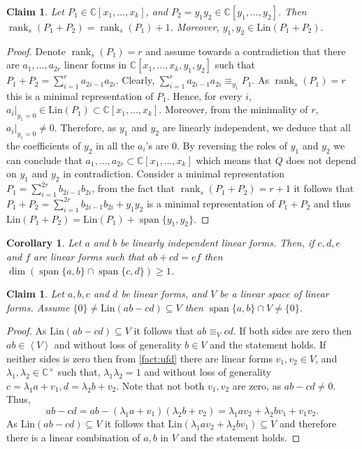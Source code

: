 \documentclass[10pt,a4paper]{article}
\newtheorem{claim}[theorem]{Claim}
\newtheorem{corollary}[theorem]{Corollary}
\def\rank{\operatorname{rank}}
\renewcommand{\C}{\mathbb{C}}
\newcommand{\ideal}[1]{\left \langle{#1}\right \rangle}
\newcommand{\MVar}[2]{{#1}_1,\ldots, {#1}_{#2}}
\newcommand{\PRing}[3]{\mathbb{#1}[ \MVar{#2}{#3}]}
\newcommand{\CRing}[2]{\PRing{C}{#1}{#2}}
\newcommand{\spn}[1]{\operatorname{span}\{{#1}\}}
\newcommand{\MS}{\text{Lin}}
\begin{document}
\begin{claim}\label{cla:ind-rank}
Let $P_1\in \CRing{x}{k}$, and $P_2 = y_1y_2\in \CRing{y}{2}$. Then $ \rank_s (P_1+P_2) = \rank_s(P_1) + 1$. Moreover, $y_1,y_2 \in \MS(P_1+P_2).$
\end{claim}

\begin{proof}
Denote $\rank_s(P_1) = r$ and assume towards a contradiction that there are $\MVar{a}{2r}$ linear forms in $\C[x_1,\dots,x_k,y_1,y_2]$ such that $P_1+P_2 = \sum\limits_{i=1}^{r}a_{2i-1}a_{2i}$. 
Clearly, $\sum\limits_{i=1}^{r}a_{2i-1}a_{2i} \equiv_{y_1} P_1$. As $\rank_s(P_1) = r$  this is a minimal representation of $P_1$. Hence, for every $i$, $a_i|_{y_1=0} \in\MS(P_1)\subset \CRing{x}{k}$. Moreover, from the minimality of $r$, $a_i|_{y_1=0} \neq 0$. Therefore, as $y_1$ and $y_2$ are linearly independent, we deduce that all the coefficients of $y_2$ in all the $a_i$'s are 0. By reversing the roles of $y_1$ and $y_2$ we can conclude that $\MVar{a}{2r}\subset \CRing{x}{k}$ which  means that $Q$ does not depend on $y_1$ and $y_2$ in contradiction. Consider a minimal representation $P_1 = \sum_{i=1}^{2r} b_{2i-1}b_{2i}$,  from the fact that $\rank_s(P_1+P_2) = r+1$ it follows that  $P_1+P_2 = \sum_{i=1}^{2r} b_{2i-1}b_{2i}+y_1y_2$ is a minimal representation of $P_1+P_2$ and thus $\MS(P_1+P_2) =\MS(P_1) + \spn{y_1,y_2}$. 
\end{proof}

\begin{corollary}\label{cla:intersection}
Let $a$ and $b$ be linearly independent linear forms. Then, if $c,d,e$ and $f$ are linear forms such that $ab+cd=ef$ then $\dim(\spn{a,b}\cap \spn{c,d})\geq 1$.
\end{corollary}

\begin{claim}\label{cla:rank-2-in-V}
Let $a,b,c$ and $d$ be linear forms, and $V$ be a linear space of linear forms. Assume $\{0\} \neq \MS(ab-cd) \subseteq V$ then $\spn{a,b} \cap V\neq \{0\}$.	
\end{claim}

\begin{proof}
	As $\MS(ab-cd) \subseteq V$ it follows that $ab \equiv_{V} cd$. If both sides are zero then $ab\in \ideal{V}$ and without loss of generality $b\in V$ and the statement holds. If neither sides is zero then from \autoref{fact:ufd} there are linear forms $v_1, v_2 \in V$, and $\lambda_1, \lambda_2 \in \C^\times$ such that, $\lambda_1\lambda_2 = 1$ and without loss of generality $c = \lambda_1a + v_1, d= \lambda_2 b+v_2$. Note that not both $v_1,v_2$ are zero, as $ab-cd \neq 0$. Thus, \[ab-cd = ab - (\lambda_1 a +  v_1)(\lambda_2 b+v_2)= \lambda_1 av_2+\lambda_2 bv_1 + v_1v_2. \]
	As $\MS(ab-cd) \subseteq V$ it follows that $\MS(\lambda_1 av_2+\lambda_2 bv_1) \subseteq V$ and therefore there is a linear combination of $a,b$ in $V$ and the statement holds.
\end{proof}
\end{document}

